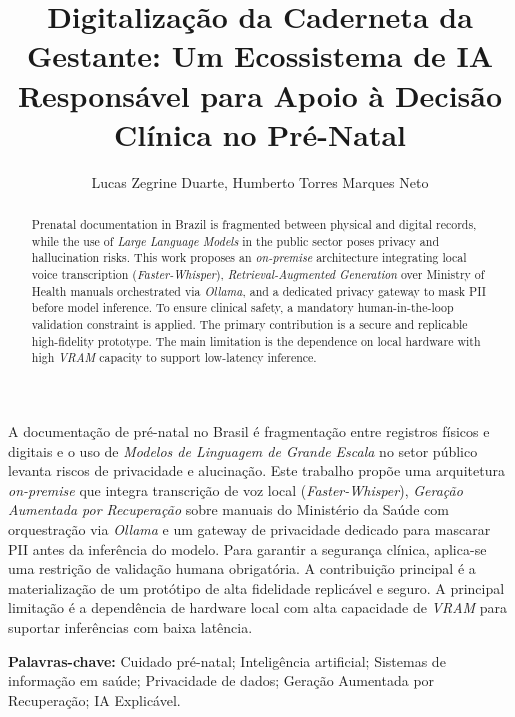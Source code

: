 \documentclass[12pt]{article}
\title{Digitalização da Caderneta da Gestante: Um Ecossistema de IA Responsável para Apoio à Decisão Clínica no Pré-Natal}
\author{Lucas Zegrine Duarte\inst{1}, Humberto Torres Marques Neto\inst{1}}
\begin{document}
\maketitle

\begin{abstract}
  Prenatal documentation in Brazil is fragmented between physical and digital records, while the use of \textit{Large Language Models} in the public sector poses privacy and hallucination risks.
  This work proposes an \textit{on-premise} architecture integrating local voice transcription (\textit{Faster-Whisper}), \textit{Retrieval-Augmented Generation} over Ministry of Health manuals orchestrated via \textit{Ollama}, and a dedicated privacy gateway to mask PII before model inference.
  To ensure clinical safety, a mandatory human-in-the-loop validation constraint is applied. The primary contribution is a secure and replicable high-fidelity prototype.
  The main limitation is the dependence on local hardware with high \textit{VRAM} capacity to support low-latency inference.
\end{abstract}

\begin{resumo}
  A documentação de pré-natal no Brasil é fragmentação entre registros físicos e digitais e o uso de \textit{Modelos de Linguagem de Grande Escala} no setor público levanta riscos de privacidade e alucinação.
  Este trabalho propõe uma arquitetura \textit{on-premise} que integra transcrição de voz local (\textit{Faster-Whisper}), \textit{Geração Aumentada por Recuperação} sobre manuais do Ministério da Saúde com orquestração via \textit{Ollama} e um gateway de privacidade dedicado para mascarar PII antes da inferência do modelo.
  Para garantir a segurança clínica, aplica-se uma restrição de validação humana obrigatória. A contribuição principal é a materialização de um protótipo de alta fidelidade replicável e seguro.
  A principal limitação é a dependência de hardware local com alta capacidade de \textit{VRAM} para suportar inferências com baixa latência.
\end{resumo}

\noindent \textbf{Palavras-chave:} Cuidado pré-natal; Inteligência artificial; Sistemas de informação em saúde; Privacidade de dados; Geração Aumentada por Recuperação; IA Explicável.

\end{document}
